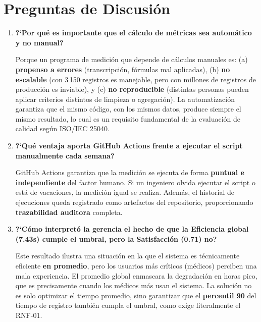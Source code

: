\documentclass[12pt,a4paper]{article}
\begin{document}
\section{Preguntas de Discusi\'on}

\begin{enumerate}
    \item \textbf{?`Por qu\'e es importante que el c\'alculo de m\'etricas sea autom\'atico y no manual?}

    Porque un programa de medici\'on que depende de c\'alculos manuales es: (a) \textbf{propenso a errores} (transcripci\'on, f\'ormulas mal aplicadas), (b) \textbf{no escalable} (con 3\,150 registros es manejable, pero con millones de registros de producci\'on es inviable), y (c) \textbf{no reproducible} (distintas personas pueden aplicar criterios distintos de limpieza o agregaci\'on). La automatizaci\'on garantiza que el mismo c\'odigo, con los mismos datos, produce siempre el mismo resultado, lo cual es un requisito fundamental de la evaluaci\'on de calidad seg\'un ISO/IEC 25040.

    \item \textbf{?`Qu\'e ventaja aporta GitHub Actions frente a ejecutar el script manualmente cada semana?}

    GitHub Actions garantiza que la medici\'on se ejecuta de forma \textbf{puntual e independiente} del factor humano. Si un ingeniero olvida ejecutar el script o est\'a de vacaciones, la medici\'on igual se realiza. Adem\'as, el historial de ejecuciones queda registrado como artefactos del repositorio, proporcionando \textbf{trazabilidad auditora} completa.

    \item \textbf{?`C\'omo interpret\'o la gerencia el hecho de que la Eficiencia global (7.43s) cumple el umbral, pero la Satisfacci\'on (0.71) no?}

    Este resultado ilustra una situaci\'on en la que el sistema es t\'ecnicamente eficiente \textbf{en promedio}, pero los usuarios m\'as cr\'iticos (m\'edicos) perciben una mala experiencia. El promedio global enmascara la degradaci\'on en horas pico, que es precisamente cuando los m\'edicos m\'as usan el sistema. La soluci\'on no es solo optimizar el tiempo promedio, sino garantizar que el \textbf{percentil 90} del tiempo de registro tambi\'en cumpla el umbral, como exige literalmente el RNF-01.
\end{enumerate}
\end{document}

